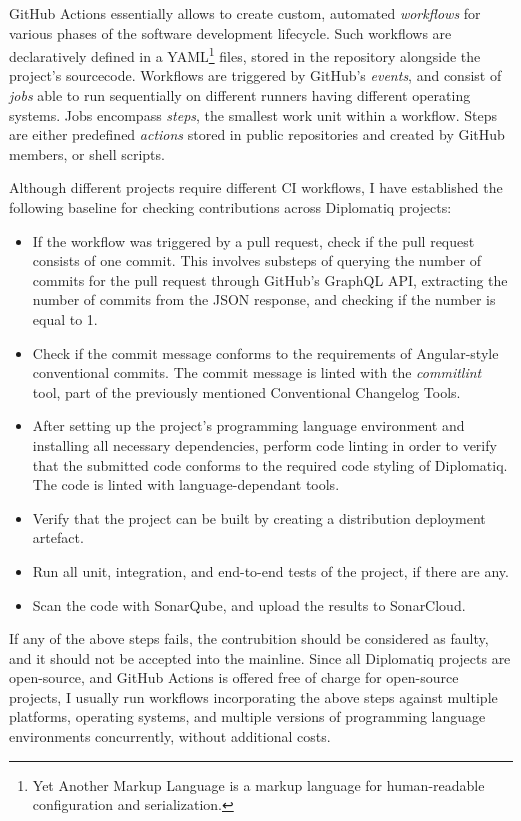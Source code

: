 GitHub Actions essentially allows to create custom, automated \emph{workflows} for various phases of the software development lifecycle. Such workflows are declaratively defined in a YAML\footnote{Yet Another Markup Language is a markup language for human-readable configuration and serialization.} files, stored in the repository alongside the project's sourcecode. Workflows are triggered by GitHub's \emph{events}, and consist of \emph{jobs} able to run sequentially on different {runners} having different operating systems. Jobs encompass \emph{steps}, the smallest work unit within a workflow. Steps are either predefined \emph{actions} stored in public repositories and created by GitHub members, or shell scripts.

Although different projects require different CI workflows, I have established the following baseline for checking contributions across Diplomatiq projects:

\begin{itemize}
\item If the workflow was triggered by a pull request, check if the pull request consists of one commit. This involves substeps of querying the number of commits for the pull request through GitHub's GraphQL API, extracting the number of commits from the JSON response, and checking if the number is equal to 1.
\item Check if the commit message conforms to the requirements of Angular-style conventional commits. The commit message is linted with the \emph{commitlint} tool, part of the previously mentioned Conventional Changelog Tools.
\item After setting up the project's programming language environment and installing all necessary dependencies, perform code linting in order to verify that the submitted code conforms to the required code styling of Diplomatiq. The code is linted with language-dependant tools.
\item Verify that the project can be built by creating a distribution deployment artefact.
\item Run all unit, integration, and end-to-end tests of the project, if there are any.
\item Scan the code with SonarQube, and upload the results to SonarCloud.
\end{itemize}

If any of the above steps fails, the contrubition should be considered as faulty, and it should not be accepted into the mainline. Since all Diplomatiq projects are open-source, and GitHub Actions is offered free of charge for open-source projects, I usually run workflows incorporating the above steps against multiple platforms, operating systems, and multiple versions of programming language environments concurrently, without additional costs.

